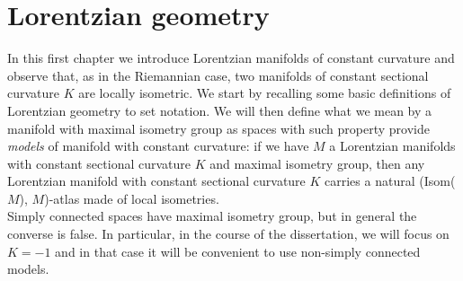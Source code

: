 \chapter{Lorentzian geometry}

In this first chapter we introduce Lorentzian manifolds of constant curvature and observe that, as in the Riemannian case, two manifolds of constant sectional curvature $K$ are locally isometric. We start by recalling some basic definitions of Lorentzian geometry to set notation. We will then define what we mean by a manifold with maximal isometry group as spaces with such property provide \textit{models} of manifold with constant curvature: if we have $M$ a Lorentzian manifolds with constant sectional curvature $K$ and maximal isometry group, then any Lorentzian manifold with constant sectional curvature $K$ carries a natural (Isom($M$), $M$)-atlas made of local isometries. \\
Simply connected spaces have maximal isometry group, but in general the converse is false. In particular, in the course of the dissertation, we will focus on $K=-1$ and in that case it will be convenient to use non-simply connected models. 

